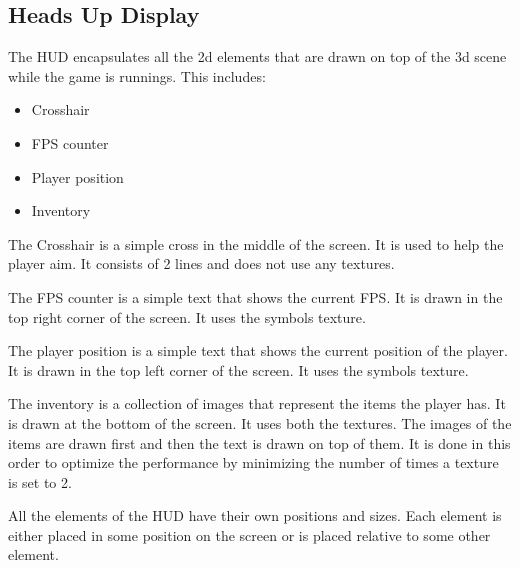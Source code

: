 \subsection*{Heads Up Display} \label{sec:hud}
The HUD encapsulates all the 2d elements that are drawn on top of the 3d scene while the game is runnings.
This includes:
\begin{itemize}
    \item Crosshair
    \item FPS counter
    \item Player position
    \item Inventory
\end{itemize}

The Crosshair is a simple cross in the middle of the screen.
It is used to help the player aim.
It consists of 2 lines and does not use any textures.

The FPS counter is a simple text that shows the current FPS.
It is drawn in the top right corner of the screen.
It uses the symbols texture.

The player position is a simple text that shows the current position of the player.
It is drawn in the top left corner of the screen.
It uses the symbols texture.

The inventory is a collection of images that represent the items the player has.
It is drawn at the bottom of the screen.
It uses both the textures.
The images of the items are drawn first and then the text is drawn on top of them.
It is done in this order to optimize the performance by minimizing the number of times a texture is set to 2.

All the elements of the HUD have their own positions and sizes.
Each element is either placed in some position on the screen or is placed relative to some other element.